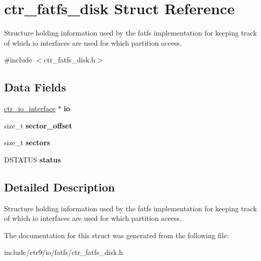 \hypertarget{structctr__fatfs__disk}{}\section{ctr\+\_\+fatfs\+\_\+disk Struct Reference}
\label{structctr__fatfs__disk}


Structure holding information used by the fatfs implementation for keeping track of which io interfaces are used for which partition access.  




{\ttfamily \#include $<$ctr\+\_\+fatfs\+\_\+disk.\+h$>$}

\subsection*{Data Fields}
\begin{DoxyCompactItemize}
\item 
\hyperlink{structctr__io__interface}{ctr\+\_\+io\+\_\+interface} $\ast$ {\bfseries io}\hypertarget{structctr__fatfs__disk_a4ef1f3ccced3ba125af13368df5b541f}{}\label{structctr__fatfs__disk_a4ef1f3ccced3ba125af13368df5b541f}

\item 
size\+\_\+t {\bfseries sector\+\_\+offset}\hypertarget{structctr__fatfs__disk_a5802d917b46c4f9695682b5d668f7663}{}\label{structctr__fatfs__disk_a5802d917b46c4f9695682b5d668f7663}

\item 
size\+\_\+t {\bfseries sectors}\hypertarget{structctr__fatfs__disk_a5ec84dd1a73d74d9d2d25d8c986aee4c}{}\label{structctr__fatfs__disk_a5ec84dd1a73d74d9d2d25d8c986aee4c}

\item 
D\+S\+T\+A\+T\+US {\bfseries status}\hypertarget{structctr__fatfs__disk_a9f464218d0d63db90a24963c3a919830}{}\label{structctr__fatfs__disk_a9f464218d0d63db90a24963c3a919830}

\end{DoxyCompactItemize}


\subsection{Detailed Description}
Structure holding information used by the fatfs implementation for keeping track of which io interfaces are used for which partition access. 

The documentation for this struct was generated from the following file\+:\begin{DoxyCompactItemize}
\item 
include/ctr9/io/fatfs/ctr\+\_\+fatfs\+\_\+disk.\+h\end{DoxyCompactItemize}
